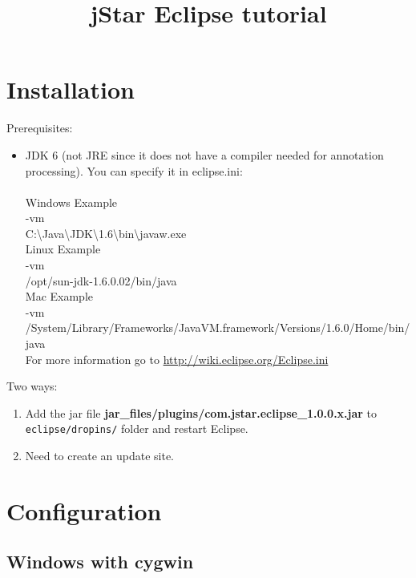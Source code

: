 \documentclass{article}
\begin{document}
\title{jStar Eclipse tutorial} 
\maketitle 


\section{Installation}

Prerequisites:
\begin{itemize}
   \item JDK 6 (not JRE since it does not have a compiler needed for annotation processing). You can specify it in eclipse.ini:\\\\
Windows Example\\
-vm\\
C:\textbackslash Java\textbackslash JDK\textbackslash 1.6\textbackslash bin\textbackslash javaw.exe\\

Linux Example\\
-vm\\
/opt/sun-jdk-1.6.0.02/bin/java\\

Mac Example\\
-vm\\
/System/Library/Frameworks/JavaVM.framework/Versions/1.6.0/Home/bin/java\\

For more information go to \href{http://wiki.eclipse.org/Eclipse.ini}{http://wiki.eclipse.org/Eclipse.ini}

\end{itemize}
Two ways:
\begin{enumerate}
\item Add the jar file \textbf{jar\_files/plugins/com.jstar.eclipse\_1.0.0.x.jar} to \texttt{eclipse/dropins/} folder and restart Eclipse.
\item {\color{red} Need to create an update site.}
\end{enumerate}

\section{Configuration}

\subsection{Windows with cygwin}
\end{document}
